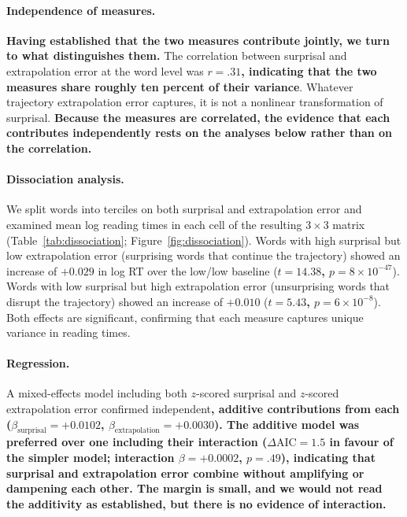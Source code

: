 \documentclass[12pt]{article}
\newcommand{\new}[1]{{\bfseries #1}}
\begin{document}
\paragraph{Independence of measures.} \new{Having established that the two measures contribute jointly, we turn to what distinguishes them.} The correlation between surprisal and extrapolation error at the word level was \new{$r = .31$, indicating that the two measures share roughly ten percent of their variance}. Whatever trajectory extrapolation error captures, it is not a nonlinear transformation of surprisal. \new{Because the measures are correlated, the evidence that each contributes independently rests on the analyses below rather than on the correlation.}

\paragraph{Dissociation analysis.} We split words into terciles on both surprisal and extrapolation error and examined mean log reading times in each cell of the resulting $3 \times 3$ matrix (Table~\ref{tab:dissociation}; Figure~\ref{fig:dissociation}). Words with high surprisal but low extrapolation error (surprising words that continue the trajectory) showed an increase of \new{$+0.029$} in log RT over the low/low baseline (\new{$t = 14.38$, $p = 8 \times 10^{-47}$}). Words with low surprisal but high extrapolation error (unsurprising words that disrupt the trajectory) showed an increase of \new{$+0.010$} (\new{$t = 5.43$, $p = 6 \times 10^{-8}$}). Both effects are significant, confirming that each measure captures unique variance in reading times.

\paragraph{Regression.} A mixed-effects model including both $z$-scored surprisal and $z$-scored extrapolation error confirmed independent\new{, additive contributions from each ($\beta_{\text{surprisal}} = +0.0102$, $\beta_{\text{extrapolation}} = +0.0030$). The additive model was preferred over one including their interaction ($\Delta\text{AIC} = 1.5$ in favour of the simpler model; interaction $\beta = +0.0002$, $p = .49$), indicating that surprisal and extrapolation error combine without amplifying or dampening each other. The margin is small, and we would not read the additivity as established, but there is no evidence of interaction.}
\end{document}
